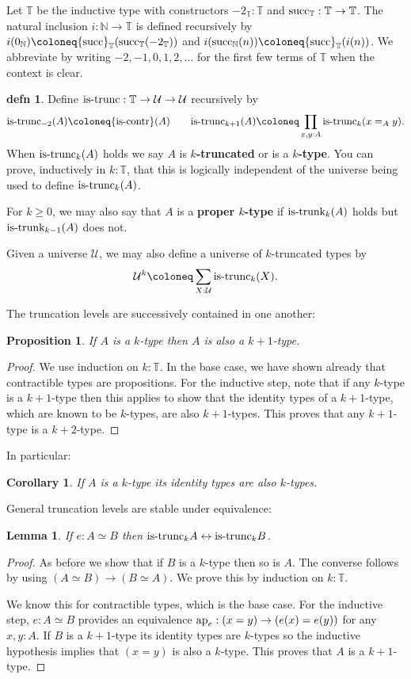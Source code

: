 \documentclass{amsart}
\theoremstyle{theorem}
\newtheorem*{lem}{Lemma}
\newtheorem*{cor}{Corollary}
\newtheorem*{prop}{Proposition}
\theoremstyle{definition}
\newtheorem*{defn}{defn}
\theoremstyle{remark}
\newcommand{\0}{\mathbbe{0}}
\newcommand{\1}{\mathbbe{1}}
\newcommand{\2}{\mathbbe{2}}
\newcommand{\3}{\mathbbe{3}}
\newcommand{\4}{\mathbbe{4}}
\newcommand{\term}[1]{{\textup{#1}}}
\newcommand{\type}[1]{{\textup{#1}}}
\newcommand{\bN}{{\mathbb{N}}}
\newcommand{\bT}{{\mathbb{T}}}
\newcommand{\suc}{\term{succ}_{\bN}}
\newcommand{\ap}{\term{ap}}
\newcommand{\UU}{{\mathcal{U}}}
\newcommand{\is}[1]{\type{is-{#1}}}
\newcommand{\iscontr}{\type{is-contr}}
\renewcommand{\iff}{\leftrightarrow}
\begin{document}
Let $\bT$ be the inductive type with constructors $-2_\bT : \bT$ and $\term{succ}_\bT : \bT \to \bT$. The natural inclusion $i \colon \bN \to \bT$ is defined recursively by $i(0_\bN) \coloneq \term{succ}_\bT (\term{succ}_\bT (-2_\bT))$ and $i(\suc(n)) \coloneq \term{succ}_\bT (i(n))$. We abbreviate by writing $-2,-1,0,1,2,\ldots$ for the first few terms of $\bT$ when the context is clear.

\begin{defn} Define $\is{trunc} : \bT \to \UU \to \UU$ recursively by
\[ \is{trunc}_{-2}(A) \coloneq \iscontr(A) \qquad \is{trunc}_{k+1}(A) \coloneq \prod_{x,y:A} \is{trunc}_k(x=_Ay).\]
When $\is{trunc}_k(A)$ holds we say $A$ is \textbf{$k$-truncated} or is a \textbf{$k$-type}. You can prove, inductively in $k : \bT$, that this is logically independent of the universe being used to define $\is{trunc}_k(A)$.
\end{defn}



For $k \geq 0$, we may also say that $A$ is a \textbf{proper $k$-type} if $\is{trunk}_k(A)$ holds but $\is{trunk}_{k-1}(A)$ does not.



Given a universe $\UU$, we may also define a universe of $k$-truncated types by
\[ \UU^k \coloneq \sum_{X:\UU} \is{trunc}_k(X).\]


The truncation levels are successively contained in one another:

\begin{prop} If $A$ is a $k$-type then $A$ is also a $k+1$-type.
\end{prop}
\begin{proof}
We use induction on $k : \bT$. In the base case, we have shown already that contractible types are propositions. For the inductive step, note that if any $k$-type is a $k+1$-type then this applies to show that the identity types of a $k+1$-type, which are known to be $k$-types, are also $k+1$-types. This proves that any $k+1$-type is a $k+2$-type.
\end{proof}

In particular:

\begin{cor} If $A$ is a $k$-type its identity types are also $k$-types.
\end{cor}

General truncation levels are stable under equivalence:

\begin{lem} If $e : A \simeq B$ then $\is{trunc}_k A \iff \is{trunc}_kB$.
\end{lem}
\begin{proof}
As before we show that if $B$ is a $k$-type then so is $A$. The converse follows by using $(A \simeq B) \to (B \simeq A)$. We prove this by induction on $k : \bT$.

We know this for contractible types, which is the base case. For the inductive step, $e: A \simeq B$ provides an equivalence $\ap_e :(x=y) \to (e(x)=e(y))$ for any $x,y:A$. If $B$ is a $k+1$-type its identity types are $k$-types so the inductive hypothesis implies that $(x=y)$ is also a $k$-type. This proves that $A$ is a $k+1$-type.
\end{proof}
\end{document}
